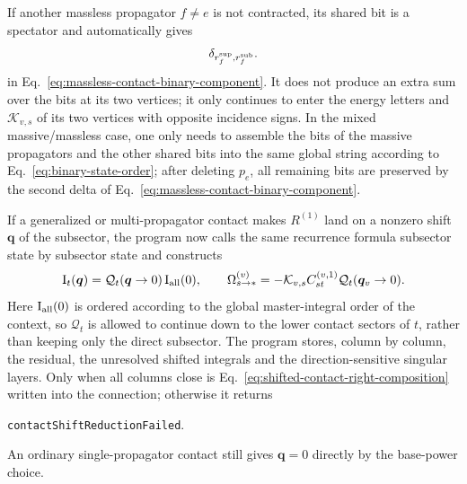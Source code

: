\documentclass[11pt,a4paper]{article}
\begin{document}
If another massless propagator $f\neq e$ is not contracted, its shared bit is a spectator and automatically gives
\begin{equation}
 \delta_{r_f^{\rm sup},r_f^{\rm sub}}.
 \label{eq:massless-spectator-delta}
\end{equation}
in Eq.~\eqref{eq:massless-contact-binary-component}. It does not produce an extra sum over the bits at its two vertices; it only continues to enter the energy letters and $\mathcal K_{v,s}$ of its two vertices with opposite incidence signs. In the mixed massive/massless case, one only needs to assemble the bits of the massive propagators and the other shared bits into the same global string according to Eq.~\eqref{eq:binary-state-order}; after deleting $p_e$, all remaining bits are preserved by the second delta of Eq.~\eqref{eq:massless-contact-binary-component}.

If a generalized or multi-propagator contact makes $R^{(1)}$ land on a nonzero shift $\bm q$ of the subsector, the program now calls the same recurrence formula subsector state by subsector state and constructs
\begin{equation}
 \bm{\text I}_t(\bm q)=\mathcal Q_t(\bm q\to0)\,\bm{\text I}_{\rm all}(0),
 \qquad
 \Omega_{s\to *}^{(v)}
 =-\mathcal K_{v,s}C_{st}^{(v,1)}\mathcal Q_t(\bm q_v\to0).
 \label{eq:shifted-contact-right-composition}
\end{equation}
Here $\bm{\text I}_{\rm all}(0)$ is ordered according to the global master-integral order of the context, so $\mathcal Q_t$ is allowed to continue down to the lower contact sectors of $t$, rather than keeping only the direct subsector. The program stores, column by column, the residual, the unresolved shifted integrals and the direction-sensitive singular layers. Only when all columns close is Eq.~\eqref{eq:shifted-contact-right-composition} written into the connection; otherwise it returns
\begin{center}
 \texttt{contactShiftReductionFailed}.
\end{center}
An ordinary single-propagator contact still gives $\bm q=0$ directly by the base-power choice.
\end{document}
